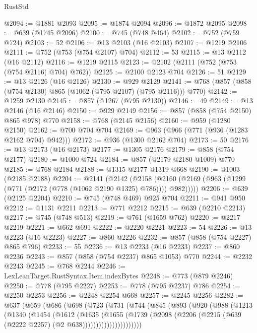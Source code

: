 \begin{lexlean}{RustStd}
\begin{coremodule}
@2094 := @1881 @2093
@2095 := @1874 @2094
@2096 := @1872 @2095
@2098 := @639 (@1745 @2096)
@2100 := @745 (@748 @464)
@2102 := @752 (@759 @724)
@2103 := 52
@2106 := @13 @2103 (@16 @2103)
@2107 := @1219 @2106
@2111 := @752 (@753 (@754 @2107) @704)
@2112 := 53
@2115 := @13 @2112 (@16 @2112)
@2116 := @1219 @2115
@2123 := @2102 (@2111 (@752 (@753 (@754 @2116) @704) @762))
@2125 := @2100 @2123 @704
@2126 := 51
@2129 := @13 @2126 (@16 @2126)
@2130 := @929 @2129
@2141 := @768 (@857 (@858 (@754 @2130) @865 (@1062 (@795 @2107) (@795 @2116))) @770)
@2142 := @1259 @2130
@2145 := @857 (@1267 (@795 @2130))
@2146 := 49
@2149 := @13 @2146 (@16 @2146)
@2150 := @929 @2149
@2156 := @857 (@858 (@754 @2150) @865 @978) @770
@2158 := @768 (@2145 @2156)
@2160 := @959 (@1280 @2150)
@2162 := @700 @704 @704
@2169 := @963 (@966 (@771 (@936 (@1283 @2162 @704) @942)))
@2172 := @936 (@1300 @2162 @704)
@2173 := 50
@2176 := @13 @2173 (@16 @2173)
@2177 := @1305 @2176
@2179 := @858 (@754 @2177)
@2180 := @1000 @724
@2184 := @857 (@2179 @2180 @1009) @770
@2185 := @768 @2184
@2188 := @1315 @2177 @1319 @668
@2190 := @1003 (@2185 @2188)
@2204 := @2141
    (@2142
      (@2158 (@2160 (@2169 (@963 (@1299 (@771 (@2172 (@778 (@1062 @2190 @1325) @786)))) @982)))))
@2206 := @639 (@2125 @2204)
@2210 := @745 (@748 @469) @925 @704
@2211 := @941 @950
@2212 := @1131 @2211
@2213 := @771 @2212
@2215 := @639 (@2210 @2213)
@2217 := @745 (@748 @513)
@2219 := @761 (@1659 @762)
@2220 := @2217 @2219
@2221 := @662 @691
@2222 := @2220 @2221
@2223 := 54
@2226 := @13 @2223 (@16 @2223)
@2227 := @860 @2226
@2232 := @857 (@858 (@754 @2227) @865 @796)
@2233 := 55
@2236 := @13 @2233 (@16 @2233)
@2237 := @860 @2236
@2243 := @857 (@858 (@754 @2237) @865 @1053) @770
@2244 := @2232 @2243
@2245 := @768 @2244
@2246 := LexLeanTarget.RustSyntax.Item.indexBytes
@2248 := @773 (@879 @2246)
@2250 := @778 (@795 @2227)
@2253 := @778 (@795 @2237) @786
@2254 := @2250 @2253
@2256 := @2248 @2254 @668
@2257 := @2245 @2256
@2282 := @637
    (@659
      (@686
        (@698
          (@723
            (@731
              (@744
                (@845
                  (@893
                    (@920
                      (@988
                        (@1213
                          (@1340
                            (@1454
                              (@1612
                                (@1635
                                  (@1655
                                    (@1739
                                      (@2098
                                        (@2206
                                          (@2215 (@639 (@2222 @2257) (@2 @638))))))))))))))))))))))

\end{coremodule}
\end{lexlean}

